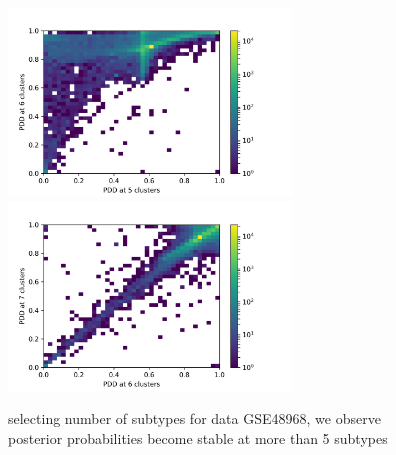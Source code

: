 \documentclass[11pt]{amsart}
\begin{document}
\begin{figure}[H]
  \includegraphics[height = 5cm, width=\linewidth]{G48_56.png}
\endminipage\hfill
{}
  \includegraphics[height = 5cm, width=\linewidth]{G48_67.png}
\endminipage\hfill
\caption{selecting number of subtypes for data GSE48968, we observe posterior probabilities become stable at more than 5 subtypes}
\end{figure}


\newpage
\appendix
\end{document}
